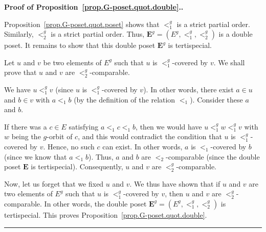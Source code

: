 \documentclass[numbers=enddot,12pt,final,onecolumn,notitlepage,abstracton]{scrartcl}%
\theoremstyle{definition}
\newenvironment{proof}[1][Proof]{\noindent\textbf{#1.} }{\ \rule{0.5em}{0.5em}}
\newcommand{\EE}{{\mathbf{E}}}
\begin{document}
\begin{proof}[Proof of Proposition~\ref{prop.G-poset.quot.double}.]

Proposition~\ref{prop.G-poset.quot.poset} shows that $<_{1}^{g}$ is a
strict partial order. Similarly, $<_{2}^{g}$ is a
strict partial order.
Thus, $\EE^g
= \left(E^g, <_1^g, <_2^g\right)$ is a double poset. It remains
to show that this double poset $\EE^g$ is tertispecial.

Let $u$ and $v$ be two elements of
$E^{g}$ such that $u$ is $<_{1}^{g}$-covered by $v$. We shall prove that $u$
and $v$ are $<_{2}^{g}$-comparable.

We have $u<_{1}^{g}v$ (since $u$ is $<_{1}^{g}$-covered by $v$). In other
words, there exist $a\in u$ and $b\in v$ with $a<_{1}b$ (by the
definition of the relation $<_1$). Consider these $a$ and $b$.


If there was a $c \in E$ satisfying $a <_1 c <_1 b$, then we
would have $u <_1^g w <_1^g v$ with $w$ being the $g$-orbit of
$c$, and this would contradict the condition that $u$ is
$<_1^g$-covered by $v$. Hence, no such $c$ can exist.
In other words, $a$ is $<_1$-covered by $b$ (since we know that
$a <_1 b$). Thus, $a$ and $b$ are $<_2$-comparable (since the
double poset $\EE$ is tertispecial).
Consequently, $u$ and $v$ are $<_2^g$-comparable.


Now, let us forget that we fixed $u$ and $v$. We thus have shown that if
$u$ and $v$ are two elements of $E^{g}$ such that $u$ is $<_{1}^{g}$-covered
by $v$, then $u$ and $v$ are $<_{2}^{g}$-comparable. In other words, the
double poset $\EE^g = \left(E^g, <_1^g, <_2^g\right)$ is tertispecial. This
proves Proposition~\ref{prop.G-poset.quot.double}.
\end{proof}
\end{document}
